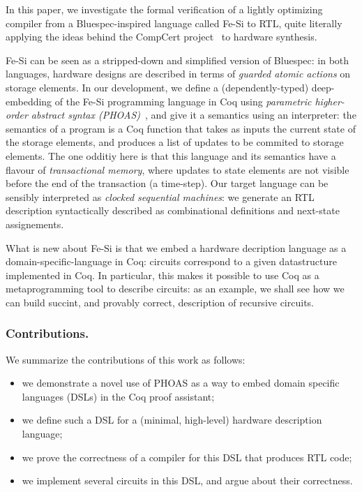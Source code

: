 \documentclass{llncs}
\newcommand{\project}{Fe-Si}
\begin{document}
\medskip In this paper, we investigate the formal verification of a
lightly optimizing compiler from a Bluespec-inspired language called
\project{} to RTL, quite literally applying the ideas behind the
CompCert project~\cite{Leroy-Compcert-CACM} to hardware synthesis.

\medskip

\project{} can be seen as a stripped-down and simplified version
of Bluespec: in both languages, hardware designs are described in
terms of \emph{guarded atomic actions} on storage elements. 
%
In our development, we define a (dependently-typed) deep-embedding of
the \project{} programming language in Coq using \emph{parametric
  higher-order abstract syntax (PHOAS)}~\cite{phoas-chlipala}, and
give it a semantics\thomas{~} using an interpreter: the semantics of a program
is a Coq function that takes as inputs the current state of the
storage elements, and produces a list of updates to be commited to
storage elements.
%
The one odditiy here is that this language and its semantics have a
flavour of \emph{transactional memory}, where updates to state
elements are not visible before the end of the transaction (a
time-step).
%
Our target language can be sensibly interpreted as \emph{clocked
  sequential machines}: we generate an RTL description syntactically
described as combinational definitions and next-state assignements.

\medskip

What is new about \project{} is that we embed a hardware decription
language as a domain-specific-language in Coq: circuits correspond to
a given datastructure implemented in Coq.
%
In particular, this makes it possible to use Coq as a metaprogramming
tool to describe circuits: as an example, we shall see how we can
build succint, and provably correct, description of recursive
circuits.



\subsubsection{Contributions.}
We summarize the contributions of this work as follows:
\begin{itemize}
\item we demonstrate a novel use of PHOAS as a way to embed domain
  specific languages (DSLs) in the Coq proof assistant;
\item we define such a DSL for a (minimal, high-level) hardware
  description language;
\item we prove the correctness of a compiler for this DSL that
  produces RTL code; 
\item we implement several circuits in this DSL, and argue about their
  correctness. 
\end{itemize}
\end{document}
